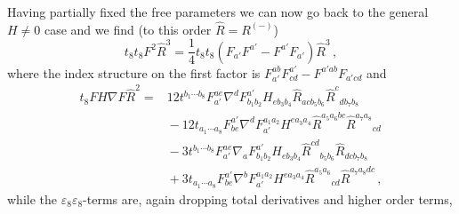 \documentclass[a4paper,11pt]{article}
\begin{document}
Having partially fixed the free parameters we can now go back to the general $H\neq0$ case and we find (to this order $\hat R=R^{(-)}$)
\begin{equation}
t_8t_8F^2\hat R^3=\frac{1}{4}t_8t_8(F_{a'}F^{a'}-F^{a'}F_{a'})\hat R^3\,,
\label{eq:t8-1}
\end{equation}
where the index structure on the first factor is $F_{a'}^{ab}F^{a'}_{cd}-F^{a'ab}F_{a'cd}$ and
\begin{align}
t_8FH\nabla F\hat R^2
=&
12t^{b_1\cdots b_8}F_{a'}^{ae}\nabla^dF^{a'}_{b_1b_2}H_{eb_3b_4}\hat R_{acb_5b_6}\hat R^c{}_{db_7b_8}
\nonumber\\
&{}
-12t_{a_1\cdots a_8}F^{a'}_{be}\nabla^dF_{a'}^{a_1a_2}H^{ea_3a_4}\hat R^{a_5a_6bc}\hat R^{a_7a_8}{}_{cd}
\nonumber\\
&{}
-3t^{b_1\cdots b_8}F_{a'}^{ae}\nabla_aF^{a'}_{b_1b_2}H_{eb_3b_4}\hat R^{cd}{}_{b_5b_6}\hat R_{dcb_7b_8}
\nonumber\\
&{}
+3t_{a_1\cdots a_8}F^{a'}_{be}\nabla^bF_{a'}^{a_1a_2}H^{ea_3a_4}\hat R^{a_5a_6}{}_{cd}\hat R^{a_7a_8dc}\,,
\label{eq:t8-2}
\end{align}
while the $\varepsilon_8\varepsilon_8$-terms are, again dropping total derivatives and higher order terms,
\end{document}
